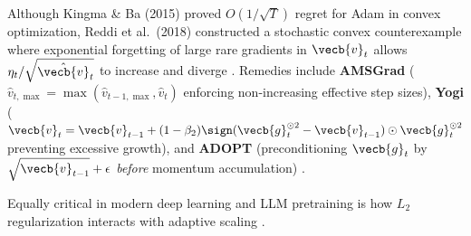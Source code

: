 \documentclass[../../../../master.tex]{subfiles}
\begin{document}
Although Kingma \& Ba (2015) proved $O(1/\sqrt{T})$ regret for Adam in convex optimization, Reddi et al.\ (2018) constructed a stochastic convex counterexample where exponential forgetting of large rare gradients in $\vecb{v}_t$ allows $\eta_t / \sqrt{\hat{\vecb{v}}_t}$ to increase and diverge  . Remedies include \textbf{AMSGrad} ($\hat{v}_{t,\max} = \max(\hat{v}_{t-1,\max}, \hat{v}_t)$ enforcing non-increasing effective step sizes), \textbf{Yogi} ($\vecb{v}_t = \vecb{v}_{t-1} + (1-\beta_2)\sign(\vecb{g}_t^{\odot 2} - \vecb{v}_{t-1}) \odot \vecb{g}_t^{\odot 2}$ preventing excessive growth), and \textbf{ADOPT} (preconditioning $\vecb{g}_t$ by $\sqrt{\vecb{v}_{t-1}}+\epsilon$ \emph{before} momentum accumulation) .

Equally critical in modern deep learning and LLM pretraining is how $L_2$ regularization interacts with adaptive scaling  .
\end{document}
